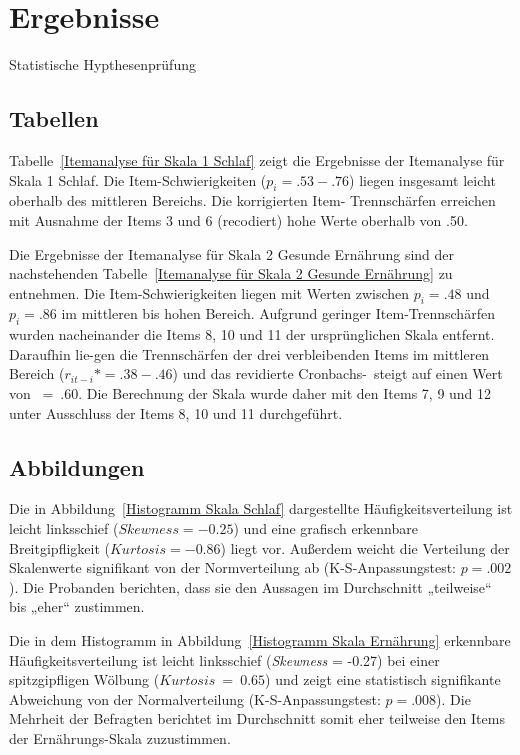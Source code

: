 \chapter{Ergebnisse}   \label{ch_3}
Statistische Hypthesenprüfung

\section{Tabellen}
Tabelle~\ref{Itemanalyse für Skala 1 Schlaf} zeigt die Ergebnisse der Itemanalyse 
für Skala 1 Schlaf. Die Item-Schwierigkeiten ($p_i = .53-.76$) liegen 
insgesamt leicht oberhalb des mittleren Bereichs. Die korrigierten Item-
Trennschärfen erreichen mit Ausnahme der Items 3 und 6 (recodiert) hohe Werte 
oberhalb von .50. 


Die Ergebnisse der Itemanalyse für Skala 2 Gesunde Ernährung sind der 
nachstehenden Tabelle~\ref{Itemanalyse für Skala 2 Gesunde Ernährung} zu entnehmen. 
Die Item-Schwierigkeiten liegen mit Werten zwischen $p_i = .48$ und $p_i = .86$ 
im mittleren bis hohen Bereich. Aufgrund geringer Item-Trennschärfen 
wurden nacheinander die Items 8, 10 und 11 der ursprünglichen Skala entfernt. 
Daraufhin lie-gen die Trennschärfen der drei verbleibenden Items im mittleren 
Bereich ($r_{it-i}* = .38 - .46$) und das revidierte Cronbachs-\textalpha \ 
steigt auf einen Wert von \textalpha*~=~.60. Die Berechnung der Skala 
wurde daher mit den Items 7, 9 und 12 unter Ausschluss der Items 8, 10 und 11 
durchgeführt.



\section{Abbildungen}
Die in Abbildung~\ref{Histogramm Skala Schlaf} dargestellte Häufigkeitsverteilung 
ist leicht linksschief \mbox{($Skewness = -0.25$)} und eine grafisch erkennbare 
Breitgipfligkeit ($Kurtosis = -0.86$) liegt vor. Außerdem weicht die 
Verteilung der Skalenwerte signifikant von der Normverteilung ab 
(K-S-Anpassungstest: $p = .002$). Die Probanden berichten, dass sie den Aussagen im 
Durchschnitt „teilweise“ bis „eher“ zustimmen.


Die in dem Histogramm in Abbildung~\ref{Histogramm Skala Ernährung} erkennbare 
Häufigkeitsverteilung ist leicht linksschief (\textit{Skewness} = -0.27) bei einer 
spitzgipfligen Wölbung ($Kurtosis~=~0.65$) und zeigt eine statistisch signifikante 
Abweichung von der Normalverteilung (K-S-Anpassungstest: $p = .008$). Die Mehrheit 
der Befragten berichtet im Durchschnitt somit eher teilweise den Items der 
Ernährungs-Skala zuzustimmen.
